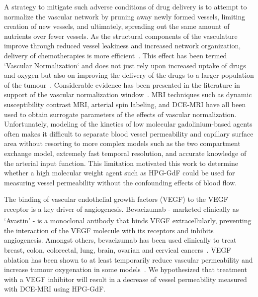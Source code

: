 A strategy to mitigate such adverse conditions of drug delivery is to attempt to normalize the vascular network by pruning away newly formed vessels, limiting creation of new vessels, and ultimately, spreading out the same amount of nutrients over fewer vessels.
As the structural components of the vasculature improve through reduced vessel leakiness and increased network organization, delivery of chemotherapies is more efficient~\cite{Jain:2001uf}.
This effect has been termed `Vascular Normalization` and does not just rely upon increased uptake of drugs and oxygen but also on improving the delivery of the drugs to a larger population of the tumour~\cite{Jain:2005gk}.
Considerable evidence has been presented in the literature in support of the vascular normalization window~\cite{Jain:2005gk,Viallard:2017ck,Martin:2019io}.
MRI techniques such as dynamic susceptibility contrast MRI, arterial spin labeling, and \acs{DCE-MRI} have all been used to obtain surrogate parameters of the effects of vascular normalization.
Unfortunately, modeling of the kinetics of low molecular gadolinium-based agents often makes it difficult to separate blood vessel permeability and capillary surface area without resorting to more complex models such as the two compartment exchange model, extremely fast temporal resolution, and accurate knowledge of the arterial input function.
This limitation motivated this work to determine whether a high molecular weight agent such as \acs{HPG-GdF} could be used for measuring vessel permeability without the confounding effects of blood flow.

The binding of vascular endothelial growth factors (\acs{VEGF}) to the \acs{VEGF} receptor is a key driver of angiogenesis.
Bevacizumab - marketed clinically as `Avastin\textsuperscript{\textcopyright}' - is a monoclonal antibody that binds VEGF extracellularly, preventing the interaction of the \acs{VEGF} molecule with its receptors and inhibits angiogenesis. 
Amongst others, bevacizumab has been used clinically to treat breast, colon, colorectal, lung, brain, ovarian and cervical cancers~\cite{Genentech:2019th}. 
\acs{VEGF} ablation has been shown to at least temporarily reduce vascular permeability and increase tumour oxygenation in some models~\cite{OConnor:2012ie}.
We hypothesized that treatment with a \acs{VEGF} inhibitor will result in a decrease of vessel permeability measured with \acs{DCE-MRI} using \acs{HPG-GdF}.

